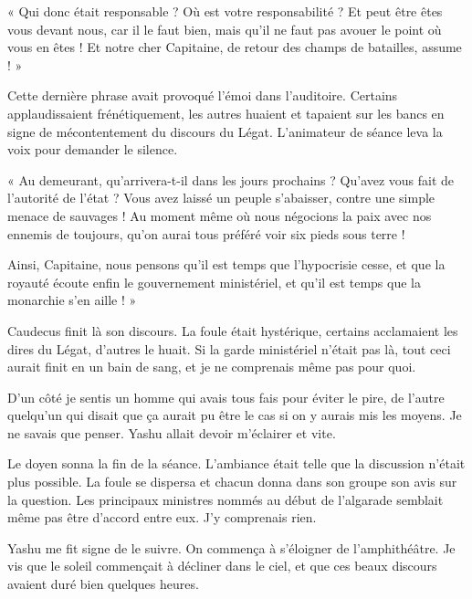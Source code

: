 \documentclass{book}
\begin{document}
« Qui donc était responsable ? Où est votre responsabilité ? Et peut être êtes vous devant nous, car il le faut bien, mais qu'il ne faut pas avouer le point où vous en êtes ! Et notre cher Capitaine, de retour des champs de batailles, assume ! »\newline

Cette dernière phrase avait provoqué l'émoi dans l'auditoire. Certains applaudissaient frénétiquement, les autres huaient et tapaient sur les bancs en signe de mécontentement du discours du Légat. L'animateur de séance leva la voix pour demander le silence.\newline

« Au demeurant, qu'arrivera-t-il dans les jours prochains ? Qu'avez vous fait de l'autorité de l'état ? Vous avez laissé un peuple s'abaisser, contre une simple menace de sauvages ! Au moment même où nous négocions la paix avec nos ennemis de toujours, qu'on aurai tous préféré voir six pieds sous terre !

Ainsi, Capitaine, nous pensons qu'il est temps que l'hypocrisie cesse, et que la royauté écoute enfin le gouvernement ministériel, et qu'il est temps que la monarchie s'en aille !  »\newline

Caudecus finit là son discours. La foule était hystérique, certains acclamaient les dires du Légat, d'autres le huait. Si la garde ministériel n'était pas là, tout ceci aurait finit en un bain de sang, et je ne comprenais même pas pour quoi.\newline

D'un côté je sentis un homme qui avais tous fais pour éviter le pire, de l'autre quelqu'un qui disait que ça aurait pu être le cas si on y aurais mis les moyens. Je ne savais que penser. Yashu allait devoir m'éclairer et vite.\newline

Le doyen sonna la fin de la séance. L'ambiance était telle que la discussion n'était plus possible. La foule se dispersa et chacun donna dans son groupe son avis sur la question. Les principaux ministres nommés au début de l'algarade semblait même pas être d'accord entre eux. J'y comprenais rien.\newline

Yashu me fit signe de le suivre. On commença à s'éloigner de l'amphithéâtre. Je vis que le soleil commençait à décliner dans le ciel, et que ces beaux discours avaient duré bien quelques heures.\newline
\end{document}
